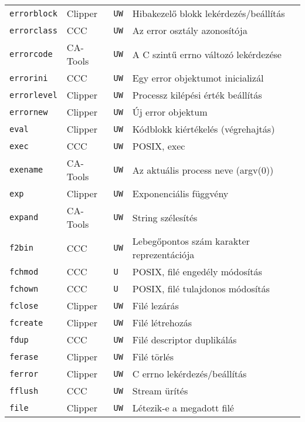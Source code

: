 \begin{tabular}{|l|l|l|l|}
\verb!errorblock!                  & Clipper  &  {\tt UW} & Hibakezelő blokk lekérdezés/beállítás\\
\verb!errorclass!                  & CCC      &  {\tt UW} & Az error osztály azonosítója\\
\verb!errorcode!                   & CA-Tools &  {\tt UW} & A C szintű errno változó lekérdezése\\
\verb!errorini!                    & CCC      &  {\tt UW} & Egy error objektumot inicializál\\
\verb!errorlevel!                  & Clipper  &  {\tt UW} & Processz kilépési érték beállítás\\
\verb!errornew!                    & Clipper  &  {\tt UW} & Új error objektum\\
\verb!eval!                        & Clipper  &  {\tt UW} & Kódblokk kiértékelés (végrehajtás)\\
\verb!exec!                        & CCC      &  {\tt UW} & POSIX, exec\\
\verb!exename!                     & CA-Tools &  {\tt UW} & Az aktuális process neve (argv(0))\\
\verb!exp!                         & Clipper  &  {\tt UW} & Exponenciális függvény\\
\verb!expand!                      & CA-Tools &  {\tt UW} & String szélesítés\\
\verb!f2bin!                       & CCC      &  {\tt UW} & Lebegőpontos szám karakter reprezentációja\\
\verb!fchmod!                      & CCC      &  {\tt U~} & POSIX, filé engedély módosítás\\
\verb!fchown!                      & CCC      &  {\tt U~} & POSIX, filé tulajdonos módosítás\\
\verb!fclose!                      & Clipper  &  {\tt UW} & Filé lezárás\\
\verb!fcreate!                     & Clipper  &  {\tt UW} & Filé létrehozás\\   
\verb!fdup!                        & CCC      &  {\tt UW} & Filé descriptor duplikálás\\
\verb!ferase!                      & Clipper  &  {\tt UW} & Filé törlés\\
\verb!ferror!                      & Clipper  &  {\tt UW} & C errno lekérdezés/beállítás\\
\verb!fflush!                      & CCC      &  {\tt UW} & Stream ürítés\\
\verb!file!                        & Clipper  &  {\tt UW} & Létezik-e a megadott filé\\

\end{tabular}
